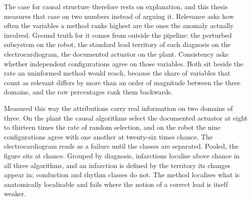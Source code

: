 The case for causal structure therefore rests on explanation, and this thesis measures that case on two numbers instead of arguing it. Relevance asks how often the variables a method ranks highest are the ones the anomaly actually involved. Ground truth for it comes from outside the pipeline: the perturbed subsystem on the robot, the standard lead territory of each diagnosis on the electrocardiogram, the documented actuator on the plant. Consistency asks whether independent configurations agree on those variables. Both sit beside the rate an uninformed method would reach, because the share of variables that count as relevant differs by more than an order of magnitude between the three domains, and the raw percentages rank them backwards.

Measured this way the attributions carry real information on two domains of three. On the plant the causal algorithms select the documented actuator at eight to thirteen times the rate of random selection, and on the robot the nine configurations agree with one another at twenty-six times chance. The electrocardiogram reads as a failure until the classes are separated. Pooled, the figure sits at chance. Grouped by diagnosis, infarctions localise above chance in all three algorithms, and an infarction is defined by the territory its changes appear in; conduction and rhythm classes do not. The method localises what is anatomically localisable and fails where the notion of a correct lead is itself weaker.

